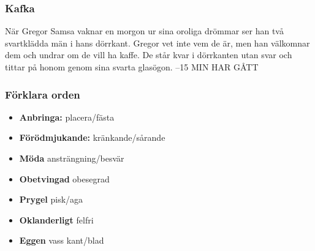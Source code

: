 \subsubsection{Kafka}
När Gregor Samsa vaknar en morgon ur sina oroliga drömmar ser han två svartklädda män i hans dörrkant. Gregor vet inte vem de är, men han välkomnar dem och undrar om de vill ha kaffe. De står kvar i dörrkanten utan svar och tittar på honom genom sina svarta glasögon. --15 MIN HAR GÅTT

\subsubsection{Förklara orden}
\begin{itemize}
	\item \textbf{Anbringa:} placera/fästa
	\item \textbf{Förödmjukande:} kränkande/sårande
	\item \textbf{Möda} ansträngning/besvär
	\item \textbf{Obetvingad} obesegrad
	\item \textbf{Prygel} pisk/aga
	\item \textbf{Oklanderligt} felfri
	\item \textbf{Eggen} vass kant/blad
\end{itemize}
























